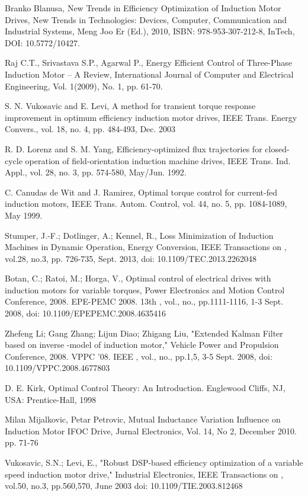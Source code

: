 \documentclass[journal]{IEEEtran}
\begin{document}
\begin{thebibliography}{}

 Branko Blanusa, New Trends in Efficiency Optimization of Induction Motor Drives, New Trends in Technologies: Devices, Computer, Communication and Industrial Systems, Meng Joo Er (Ed.), 2010, ISBN: 978-953-307-212-8, InTech, DOI: 10.5772/10427. 

 Raj C.T., Srivastava S.P., Agarwal P., Energy Efficient Control of Three-Phase Induction Motor -- A Review, International Journal of Computer and Electrical Engineering, Vol. 1(2009), No. 1, pp. 61-70.

 S. N. Vukosavic and E. Levi, A method for transient torque response improvement in optimum efficiency induction motor drives, IEEE Trans.
Energy Convers., vol. 18, no. 4, pp. 484-493, Dec. 2003

 R. D. Lorenz and S. M. Yang, Efficiency-optimized flux trajectories for closed-cycle operation of field-orientation induction machine drives, IEEE Trans. Ind. Appl., vol. 28, no. 3, pp. 574-580, May/Jun. 1992.

 C. Canudas de Wit and J. Ramirez, Optimal torque control for current-fed induction motors, IEEE Trans. Autom. Control, vol. 44, no. 5, pp. 1084-1089, May 1999.

 Stumper, J.-F.; Dotlinger, A.; Kennel, R., Loss Minimization of Induction Machines in Dynamic Operation, Energy Conversion, IEEE Transactions on , vol.28, no.3, pp. 726-735, Sept. 2013, doi: 10.1109/TEC.2013.2262048

 Botan, C.; Ratoi, M.; Horga, V., Optimal control of electrical drives with induction motors for variable torques, Power Electronics and Motion Control Conference, 2008. EPE-PEMC 2008. 13th , vol., no., pp.1111-1116, 1-3 Sept. 2008, doi: 10.1109/EPEPEMC.2008.4635416

 Zhefeng Li; Gang Zhang; Lijun Diao; Zhigang Liu, "Extended Kalman Filter based on inverse -model of induction motor," Vehicle Power and Propulsion Conference, 2008. VPPC '08. IEEE , vol., no., pp.1,5, 3-5 Sept. 2008, doi: 10.1109/VPPC.2008.4677803

 D. E. Kirk, Optimal Control Theory: An Introduction. Englewood Cliffs, NJ, USA: Prentice-Hall, 1998

 Milan Mijalkovic, Petar Petrovic, Mutual Inductance Variation Influence on Induction Motor IFOC Drive, Jurnal Electronics, Vol. 14, No 2, December 2010. pp. 71-76

 Vukosavic, S.N.; Levi, E., "Robust DSP-based efficiency optimization of a variable speed induction motor drive," Industrial Electronics, IEEE Transactions on , vol.50, no.3, pp.560,570, June 2003
doi: 10.1109/TIE.2003.812468


\end{thebibliography}
\end{document}
